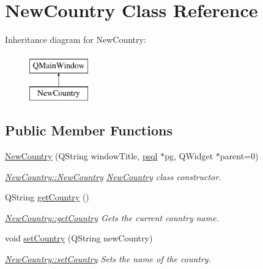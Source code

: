 \hypertarget{class_new_country}{}\section{New\+Country Class Reference}
\label{class_new_country}
Inheritance diagram for New\+Country\+:\begin{figure}[H]
\begin{center}
\leavevmode
\includegraphics[height=2.000000cm]{class_new_country}
\end{center}
\end{figure}
\subsection*{Public Member Functions}
\begin{DoxyCompactItemize}
\item 
\hyperlink{class_new_country_a0ab1a95a2acd77e953f3a7aac8544880}{New\+Country} (Q\+String window\+Title, \hyperlink{classpsql}{psql} $\ast$pg, Q\+Widget $\ast$parent=0)
\begin{DoxyCompactList}\small\item\em \hyperlink{class_new_country_a0ab1a95a2acd77e953f3a7aac8544880}{New\+Country\+::\+New\+Country} \hyperlink{class_new_country}{New\+Country} class constructor. \end{DoxyCompactList}\item 
Q\+String \hyperlink{class_new_country_a5d28702b9788a1debf6817443d4a7355}{get\+Country} ()
\begin{DoxyCompactList}\small\item\em \hyperlink{class_new_country_a5d28702b9788a1debf6817443d4a7355}{New\+Country\+::get\+Country} Gets the current country name. \end{DoxyCompactList}\item 
void \hyperlink{class_new_country_af6fed97011d536e1a29db8112849e36b}{set\+Country} (Q\+String new\+Country)
\begin{DoxyCompactList}\small\item\em \hyperlink{class_new_country_af6fed97011d536e1a29db8112849e36b}{New\+Country\+::set\+Country} Sets the name of the country. \end{DoxyCompactList}\end{DoxyCompactItemize}


